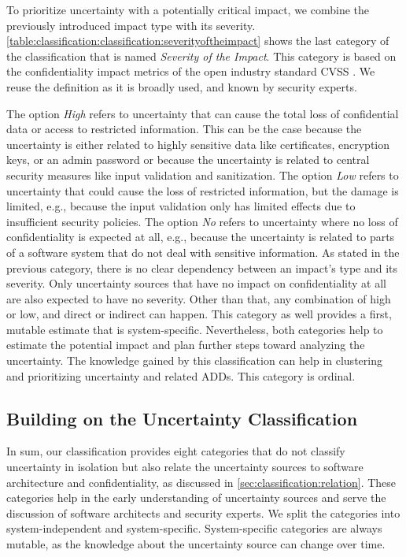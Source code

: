 To prioritize uncertainty with a potentially critical impact, we combine the previously introduced impact type with its severity.
\autoref{table:classification:classification:severityoftheimpact} shows the last category of the classification that is named \emph{Severity of the Impact}.
This category is based on the confidentiality impact metrics of the open industry standard \acf{CVSS} \cite{CVSS}.
We reuse the definition as it is broadly used, and known by security experts.

The option \emph{High} refers to uncertainty that can cause the total loss of confidential data or access to restricted information.
This can be the case because the uncertainty is either related to highly sensitive data like certificates, encryption keys, or an admin password or because the uncertainty is related to central security measures like input validation and sanitization.
The option \emph{Low} refers to uncertainty that could cause the loss of restricted information, but the damage is limited, e.g., because the input validation only has limited effects due to insufficient security policies.
The option \emph{No} refers to uncertainty where no loss of confidentiality is expected at all, e.g., because the uncertainty is related to parts of a software system that do not deal with sensitive information.
As stated in the previous category, there is no clear dependency between an impact's type and its severity.
Only uncertainty sources that have no impact on confidentiality at all are also expected to have no severity.
Other than that, any combination of high or low, and direct or indirect can happen. 
This category as well provides a first, mutable estimate that is system-specific.
Nevertheless, both categories help to estimate the potential impact and plan further steps toward analyzing the uncertainty. 
The knowledge gained by this classification can help in clustering and prioritizing uncertainty and related \acp{ADD}.
This category is ordinal.


\subsection{Building on the Uncertainty Classification}

In sum, our classification provides eight categories that do not classify uncertainty in isolation but also relate the uncertainty sources to software architecture and confidentiality, as discussed in \autoref{sec:classification:relation}.
These categories help in the early understanding of uncertainty sources and serve the discussion of software architects and security experts.
We split the categories into system-independent and system-specific.
System-specific categories are always mutable, as the knowledge about the uncertainty source can change over time.

